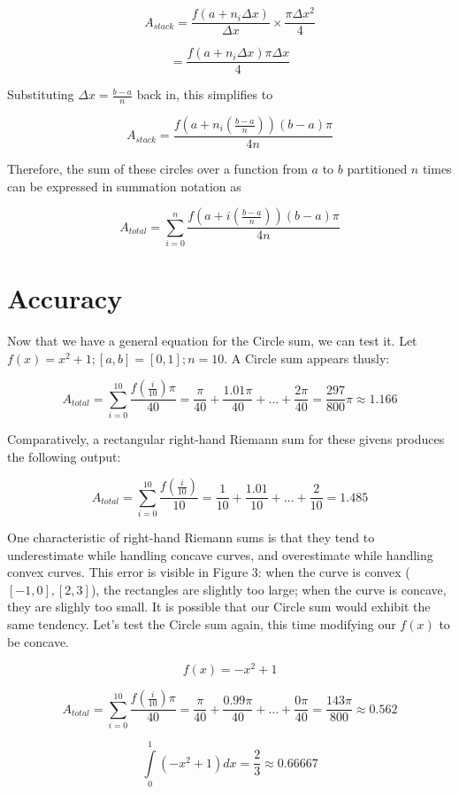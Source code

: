 \documentclass{article}
\begin{document}
        \[ A_{stack} = \frac{f(a+n_i\Delta x)}{\Delta x} \times \frac{\pi \Delta x^2}{4} \]

        \[ = \frac{f(a+n_i\Delta x)\pi\Delta x}{4} \]

        Substituting \( \Delta x = \frac{b-a}{n} \) back in, this simplifies to

        \[ A_{stack} = \frac{f(a+n_i(\frac{b-a}{n}))(b-a)\pi}{4n} \]

        Therefore, the sum of these circles over a function from \( a \) to \( b \) partitioned \( n \) times can be expressed in summation notation as

        \[ A_{total} = \displaystyle \sum_{i=0}^n \frac{f(a+i(\frac{b-a}{n}))(b-a)\pi}{4n} \]

  \section{Accuracy}
    Now that we have a general equation for the Circle sum, we can test it. Let \( f(x) = x^2 + 1; [a,b] = [0,1]; n = 10 \). A Circle sum appears thusly:

    \[ A_{total} = \displaystyle \sum_{i=0}^{10} \frac{f(\frac{i}{10})\pi}{40} = \frac{\pi}{40} + \frac{1.01\pi}{40} + \dots + \frac{2\pi}{40} = \frac{297}{800}\pi \approx 1.166 \]

    Comparatively, a rectangular right-hand Riemann sum for these givens produces the following output:

    \[ A_{total} = \displaystyle \sum_{i=0}^{10} \frac{f(\frac{i}{10})}{10} = \frac{1}{10} + \frac{1.01}{10} + \dots + \frac{2}{10} = 1.485 \]

    One characteristic of right-hand Riemann sums is that they tend to underestimate while handling concave curves, and overestimate while handling convex curves. This error is visible in Figure 3: when the curve is convex (\([-1,0],[2,3] \)), the rectangles are slightly too large; when the curve is concave, they are slighly too small. It is possible that our Circle sum would exhibit the same tendency. Let's test the Circle sum again, this time modifying our \( f(x) \) to be concave.

    \[ f(x) = -x^2 + 1 \]

    \[ A_{total} = \displaystyle \sum_{i=0}^{10} \frac{f(\frac{i}{10})\pi}{40} = \frac{\pi}{40} + \frac{0.99\pi}{40} + \dots + \frac{0\pi}{40} = \frac{143\pi}{800} \approx 0.562 \]

    \[\displaystyle \int\limits_0^1 (-x^2+1)dx = \frac{2}{3} \approx 0.66667 \]
\end{document}
